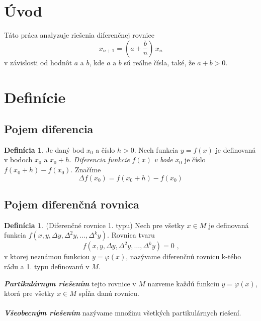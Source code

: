 \documentclass[a4paper,10pt]{article}
\theoremstyle{plain}
\theoremstyle{definition}
\newtheorem{defin}[thm]{Definícia}
\begin{document}
\newpage

\tableofcontents



\newpage
\section{Úvod}

Táto práca analyzuje riešenia diferenčnej rovnice 
\begin{equation}
x_{n+1}=\left(a+{\frac{b}{n}}\right)\,x_{n}
\end{equation}
v závislosti od hodnôt $ a $ a $ b $, kde $ a \text{ a } b $ sú reálne čísla, také, že $ a + b > 0$.
\section{Definície}
\subsection{Pojem diferencia}

\begin{defin}
Je daný bod $x_{0}$ a číslo $h > 0$. Nech funkcia $y = f(x)$ je 
definovaná v bodoch $x_{0} \text{ a } x_{0} + h$. \textit{Diferencia funkcie }$f(x)$\textit{ v bode }$x_{0}$
je číslo $f(x_{0} + h) - f(x_{0})$. Značíme
$$\Delta f(x_{0}) = f(x_{0} + h) - f(x_{0})$$
\end{defin}
\subsection{Pojem diferenčná rovnica}
\begin{defin}
(Diferenčné rovnice 1. typu) 
Nech pre všetky $x \in M$ je
definovaná funkcia $f(x, y, \Delta y, \Delta ^{2}y, \ldots, \Delta ^{k}y)$. Rovnica tvaru
$$f(x, y, \Delta y, \Delta ^{2}y, \ldots, \Delta ^{k}y) = 0 \text{ ,}$$
v ktorej neznámou funkciou $y = \varphi(x)$, nazývame diferenčnú rovnicu k-tého 
rádu a 1. typu definovanú v $M$.
\end{defin}

\textbf{\textit{Partikulárnym riešením}} tejto rovnice v $M$ nazveme každú funkciu
$y = \varphi(x)$, ktorá pre všetky $x \in M$ spĺňa danú rovnicu.

\paragraph{}
\textbf{\textit{Všeobecným riešením}} nazývame množinu všetkých partikulárnych
riešení.
\end{document}
